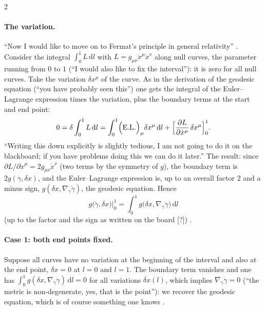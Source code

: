 \begin{paracol}{2}
\paragraph{The variation.} ``Now I would like to move on to Fermat's principle in general relativity'' . Consider the integral $\int_0^1L\,\mathrm dl$ with $L=g_{\mu\nu}\dot x^\mu\dot x^\nu$ along null curves, the parameter running from $0$ to $1$ (``I would also like to fix the interval''): it is zero for all null curves. Take the variation $\delta x^\mu$ of the curve. As in the derivation of the geodesic equation (``you have probably seen this'') one gets the integral of the Euler--Lagrange expression times the variation, plus the boundary terms at the start and end point:
\[
  0=\delta\int_0^1L\,\mathrm dl=\int_0^1\Bigl(\text{E.L.}\Bigr)_\mu\delta x^\mu\,\mathrm dl+\Bigl[\frac{\partial L}{\partial\dot x^\mu}\,\delta x^\mu\Bigr]_0^1.
\]
``Writing this down explicitly is slightly tedious, I am not going to do it on the blackboard; if you have problems doing this we can do it later.'' The result: since $\partial L/\partial\dot x^\mu=2g_{\mu\nu}\dot x^\nu$ (two terms by the symmetry of $g$), the boundary term is $2g(\dot\gamma,\delta x)$, and the Euler--Lagrange expression is, up to an overall factor $2$ and a minus sign, $g(\delta x,\nabla_{\dot\gamma}\dot\gamma)$, the geodesic equation. Hence
\begin{equation}\label{eq:c16-star}
  g\bigl(\dot\gamma,\delta x\bigr)\Big|_0^1=\int_0^1g\bigl(\delta x,\nabla_{\dot\gamma}\dot\gamma\bigr)\,\mathrm dl\tag{$\ast$}
\end{equation}
(up to the factor and the sign as written on the board [?]) .

\paragraph{Case 1: both end points fixed.} Suppose all curves have no variation at the beginning of the interval and also at the end point, $\delta x=0$ at $l=0$ and $l=1$. The boundary term vanishes and one has $\int_0^1g(\delta x,\nabla_{\dot\gamma}\dot\gamma)\,\mathrm dl=0$ for all variations $\delta x(l)$, which implies $\nabla_{\dot\gamma}\dot\gamma=0$ (``the metric is non-degenerate, yes, that is the point''): we recover the geodesic equation, which is of course something one knows .


\end{paracol}

